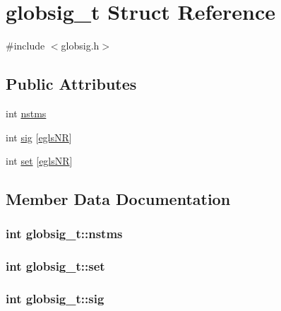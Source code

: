 \hypertarget{structglobsig__t}{\section{globsig\-\_\-t \-Struct \-Reference}
\label{structglobsig__t}
}


{\ttfamily \#include $<$globsig.\-h$>$}

\subsection*{\-Public \-Attributes}
\begin{DoxyCompactItemize}
\item 
int \hyperlink{structglobsig__t_a4ce94e90f0a0d849da6507b63da4181e}{nstms}
\item 
int \hyperlink{structglobsig__t_acefd76ed9a999df6f10970992e2651a7}{sig} \mbox{[}\hyperlink{share_2template_2gromacs_2types_2globsig_8h_a0d019765a2884a265421b443c6a956c8a156cadd3beb24e5dbb07f5ad4b62874d}{egls\-N\-R}\mbox{]}
\item 
int \hyperlink{structglobsig__t_aabc17bbafb9cb3739dc493cfe800e608}{set} \mbox{[}\hyperlink{share_2template_2gromacs_2types_2globsig_8h_a0d019765a2884a265421b443c6a956c8a156cadd3beb24e5dbb07f5ad4b62874d}{egls\-N\-R}\mbox{]}
\end{DoxyCompactItemize}


\subsection{\-Member \-Data \-Documentation}
\hypertarget{structglobsig__t_a4ce94e90f0a0d849da6507b63da4181e}{
\subsubsection[{nstms}]{\setlength{\rightskip}{0pt plus 5cm}int {\bf globsig\-\_\-t\-::nstms}}}\label{structglobsig__t_a4ce94e90f0a0d849da6507b63da4181e}
\hypertarget{structglobsig__t_aabc17bbafb9cb3739dc493cfe800e608}{
\subsubsection[{set}]{\setlength{\rightskip}{0pt plus 5cm}int {\bf globsig\-\_\-t\-::set}}}\label{structglobsig__t_aabc17bbafb9cb3739dc493cfe800e608}
\hypertarget{structglobsig__t_acefd76ed9a999df6f10970992e2651a7}{
\subsubsection[{sig}]{\setlength{\rightskip}{0pt plus 5cm}int {\bf globsig\-\_\-t\-::sig}}}\label{structglobsig__t_acefd76ed9a999df6f10970992e2651a7}


